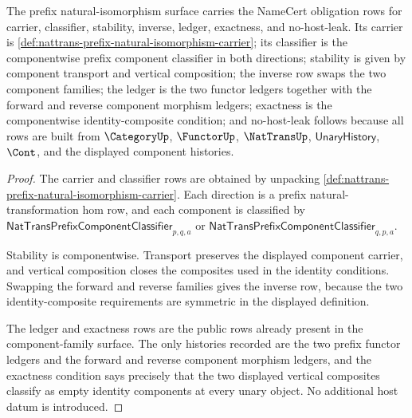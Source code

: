 \begin{theorem}
\label{thm:nattrans-natural-isomorphism-obligation-package}
The prefix natural-isomorphism surface carries the NameCert obligation rows
for carrier, classifier, stability, inverse, ledger, exactness, and
no-host-leak. Its carrier is
\autoref{def:nattrans-prefix-natural-isomorphism-carrier}; its classifier is
the componentwise prefix component classifier in both directions; stability is
given by component transport and vertical composition; the inverse row swaps
the two component families; the ledger is the two functor ledgers together
with the forward and reverse component morphism ledgers; exactness is the
componentwise identity-composite condition; and no-host-leak follows because
all rows are built from $\CategoryUp$, $\FunctorUp$, $\NatTransUp$,
$\mathsf{UnaryHistory}$, $\Cont$, and the displayed component histories.
\end{theorem}
\begin{proof}
The carrier and classifier rows are obtained by unpacking
\autoref{def:nattrans-prefix-natural-isomorphism-carrier}. Each direction is
a prefix natural-transformation hom row, and each component is classified by
$\mathsf{NatTransPrefixComponentClassifier}_{p,q,a}$ or
$\mathsf{NatTransPrefixComponentClassifier}_{q,p,a}$.

Stability is componentwise. Transport preserves the displayed component
carrier, and vertical composition closes the composites used in the identity
conditions. Swapping the forward and reverse families gives the inverse row,
because the two identity-composite requirements are symmetric in the displayed
definition.

The ledger and exactness rows are the public rows already present in the
component-family surface. The only histories recorded are the two prefix
functor ledgers and the forward and reverse component morphism ledgers, and
the exactness condition says precisely that the two displayed vertical
composites classify as empty identity components at every unary object. No
additional host datum is introduced.
\end{proof}

